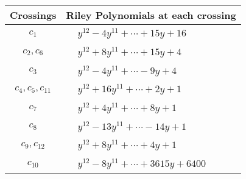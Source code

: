 \documentclass[1p]{elsarticle_modified}
\theoremstyle{definition}
\begin{document}
\begin{tabular}{m{50pt}|m{274pt}}
Crossings & \hspace{64pt}Riley Polynomials at each crossing \\
\hline $$\begin{aligned}c_{1}\end{aligned}$$&$\begin{aligned}
&y^{12}-4 y^{11}+\cdots+15 y+16
\end{aligned}$\\
\hline $$\begin{aligned}c_{2},c_{6}\end{aligned}$$&$\begin{aligned}
&y^{12}+8 y^{11}+\cdots+15 y+4
\end{aligned}$\\
\hline $$\begin{aligned}c_{3}\end{aligned}$$&$\begin{aligned}
&y^{12}-4 y^{11}+\cdots-9 y+4
\end{aligned}$\\
\hline $$\begin{aligned}c_{4},c_{5},c_{11}\end{aligned}$$&$\begin{aligned}
&y^{12}+16 y^{11}+\cdots+2 y+1
\end{aligned}$\\
\hline $$\begin{aligned}c_{7}\end{aligned}$$&$\begin{aligned}
&y^{12}+4 y^{11}+\cdots+8 y+1
\end{aligned}$\\
\hline $$\begin{aligned}c_{8}\end{aligned}$$&$\begin{aligned}
&y^{12}-13 y^{11}+\cdots-14 y+1
\end{aligned}$\\
\hline $$\begin{aligned}c_{9},c_{12}\end{aligned}$$&$\begin{aligned}
&y^{12}+8 y^{11}+\cdots+4 y+1
\end{aligned}$\\
\hline $$\begin{aligned}c_{10}\end{aligned}$$&$\begin{aligned}
&y^{12}-8 y^{11}+\cdots+3615 y+6400
\end{aligned}$\\
\hline
\end{tabular}\\~\\
\end{document}
